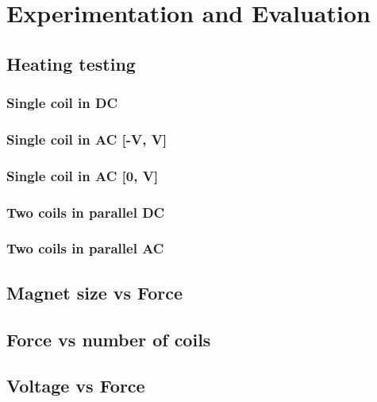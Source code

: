 \section{Experimentation and Evaluation}


\subsection{Heating testing}

\subsubsection{Single coil in DC}

\subsubsection{Single coil in AC [-V, V]}

\subsubsection{Single coil in AC [0, V]}

\subsubsection{Two coils in parallel DC}

\subsubsection{Two coils in parallel AC}

\subsection{Magnet size vs Force}

\subsection{Force vs number of coils}


\subsection{Voltage vs Force}